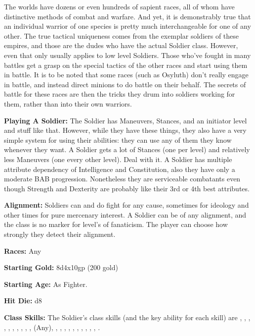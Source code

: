 
The worlds have dozens or even hundreds of sapient races, all of whom have distinctive methods of combat and warfare. And yet, it is demonstrably true that an individual warrior of one species is pretty much interchangeable for one of any other. The true tactical uniqueness comes from the exemplar soldiers of these empires, and those are the dudes who have the actual Soldier class. However, even that only usually applies to low level Soldiers. Those who've fought in many battles get a grasp on the special tactics of the other races and start using them in battle. It is to be noted that some races (such as Osyluth) don't really engage in battle, and instead direct minions to do battle on their behalf. The secrets of battle for these races are then the tricks they drum into soldiers working for them, rather than into their own warriors.

\textbf{Playing A Soldier:} The Soldier has Maneuvers, Stances, and an initiator level and stuff like that. However, while they have these things, they also have a very simple system for using their abilities: they can use any of them they know whenever they want. A Soldier gets a lot of Stances (one per level) and relatively less Maneuvers (one every other level). Deal with it. A Soldier has multiple attribute dependency of Intelligence and Constitution, also they have only a moderate BAB progression. Nonetheless they are serviceable combatants even though Strength and Dexterity are probably like their 3rd or 4th best attributes.

\textbf{Alignment:} Soldiers can and do fight for any cause, sometimes for ideology and other times for pure mercenary interest. A Soldier can be of any alignment, and the class is no marker for level's of fanaticism. The player can choose how strongly they detect their alignment.

\textbf{Races:} Any

\textbf{Starting Gold:} 8d4x10gp (200 gold)

\textbf{Starting Age:} As Fighter.

\textbf{Hit Die:} d8

\textbf{Class Skills:} The Soldier's class skills (and the key ability for each skill) are , , , , , , , , , ,  (Any), , , , , , , , , , , .

